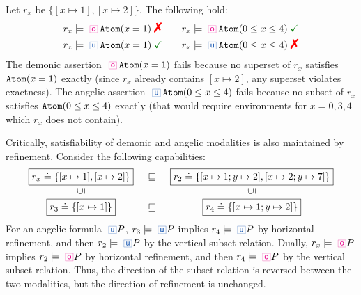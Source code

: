 \begin{example}%
  \label{ex-approximation-modalities}
  Let $r_x$ be $\{[x \mapsto 1], [x \mapsto 2]\}$. The following hold:
  \vspace{-0.2em}
  \begin{align*}
    &r_x \models \demonic\,\Code{Atom}(x = 1) \;\judgfail \quad
    &&r_x \models \demonic\,\Code{Atom}(0 \leq x \leq 4) \;\judgok \\
    &r_x \models \angelic\,\Code{Atom}(x = 1) \;\judgok \quad
    &&r_x \models \angelic\,\Code{Atom}(0 \leq x \leq 4) \;\judgfail
  \end{align*}
  The demonic assertion $\demonic\,\Code{Atom}(x = 1)$ fails because
  no superset of $r_x$ satisfies ${\tt Atom}(x = 1)$ exactly (since
  $r_x$ already contains $[x \mapsto 2]$, any superset violates
  exactness).  The angelic assertion
  $\angelic\,\Code{Atom}(0 \leq x \leq 4)$ fails because no subset of
  $r_x$ satisfies ${\tt Atom}(0 \leq x \leq 4)$ exactly (that would
  require environments for $x = 0, 3, 4$ which $r_x$ does not
  contain).

  Critically, satisfiability of demonic and angelic modalities is also
  maintained by refinement.  Consider the following capabilities:
\vspace{-0.2em}
\begin{align*}
\begin{array}{c @{\hspace{1.5em}} c @{\hspace{1.5em}} c}
  {\boxed{r_x \doteq \{[x \mapsto 1], [x \mapsto 2]\}}}
  & \sqsubseteq
  & {\boxed{r_2 \doteq \{[x \mapsto 1; y \mapsto 2], [x \mapsto 2; y \mapsto 7]\}}} \\[0.2em]
  \vsubseteq & & \vsubseteq \\[0.2em]
  {\boxed{r_3 \doteq \{[x \mapsto 1]\}}}
  & \sqsubseteq
  & {\boxed{r_4 \doteq \{[x \mapsto 1; y \mapsto 2]\}}}
\end{array}
\end{align*}\noindent
For an angelic formula $\angelic P$, $r_3 \models \angelic P$ implies
$r_4 \models \angelic P$ by horizontal refinement, and then
$r_2 \models \angelic P$ by the vertical subset relation.  Dually,
$r_x \models \demonic P$ implies $r_2 \models \demonic P$ by
horizontal refinement, and then $r_4 \models \demonic P$ by the
vertical subset relation.  Thus, the direction of the subset relation
is reversed between the two modalities, but the direction of
refinement is unchanged.


\end{example}

